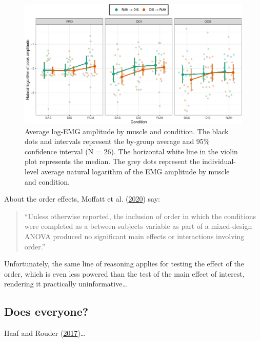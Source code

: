\documentclass[
  english,
  man,floatsintext]{apa6}
\begin{document}
\begin{figure}[!htb]

{\centering \includegraphics[width=1\linewidth]{reanalysis_files/figure-latex/order-1} 

}

\caption{Average log-EMG amplitude by muscle and condition. The black dots and intervals represent the by-group average and 95\% confidence interval (N = 26). The horizontal white line in the violin plot represents the median. The grey dots represent the individual-level average natural logarithm of the EMG amplitude by muscle and condition.}\label{fig:order}
\end{figure}

About the order effects, Moffatt et al. (\protect\hyperlink{ref-moffatt_inner_2020}{2020}) say:

\begin{quote}
``Unless otherwise reported, the inclusion of order in which the conditions were completed as a between-subjects variable as part of a mixed-design ANOVA produced no significant main effects or interactions involving order.''
\end{quote}

Unfortunately, the same line of reasoning applies for testing the effect of the order, which is even less powered than the test of the main effect of interest, rendering it practically uninformative\ldots{}

\hypertarget{does-everyone}{%
\subsection{Does everyone?}\label{does-everyone}}

Haaf and Rouder (\protect\hyperlink{ref-haaf_developing_2017}{2017})\ldots{}
\end{document}
